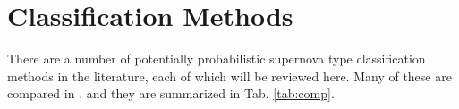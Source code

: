\documentclass[12pt, onecolumn]{emulateapj}
\newcommand{\textul}{\underline}
\begin{document}
%
%
%
%

\section{Classification Methods}

There are a number of potentially probabilistic supernova type classification methods in the literature, each of which will be reviewed here.  Many of these are compared in \citet{Kessler10}, and they are summarized in Tab. \ref{tab:comp}.  
\end{document}
